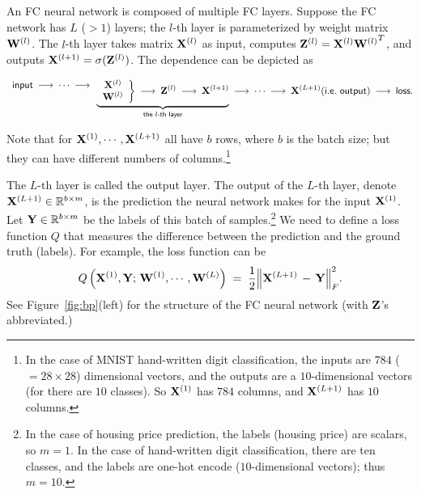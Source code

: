 \documentclass[11pt]{article}
\numberwithin{equation}{section}
\def\W{{\bf W}}
\def\X{{\bf X}}
\def\Y{{\bf Y}}
\def\Z{{\bf Z}}
\def\RB{{\mathbb R}}
\begin{document}
An FC neural network is composed of multiple FC layers.
Suppose the FC network has $L$ ($> 1$) layers; the $l$-th layer is parameterized by weight matrix $\W^{(l)}$.
The $l$-th layer takes matrix $\X^{(l)}$ as input,
computes $\Z^{(l)} = \X^{(l)} {\W^{(l)}}^T$,
and outputs $\X^{(l+1)} = \sigma (\Z^{(l)})$.
The dependence can be depicted as
\begin{small}
\begin{equation*}
    \begin{array}{c}
         \textsf{input} \: \longrightarrow \:  \cdots \: \longrightarrow   \\
         ~
    \end{array}
    \underbrace{
    \left.
    \begin{array}{c}
         \X^{(l)}   \\
         \W^{(l)} \\
    \end{array}
    \right\}
    \: \longrightarrow \: 
    \Z^{(l)}
    \: \longrightarrow \: 
    \X^{(l+1)} }_{\textsf{the } l\textsf{-th layer}} 
    \: \longrightarrow \: 
    \cdots
    \: \longrightarrow \: 
    \X^{(L+1)} (\textsf{i.e.\ output})
    \: \longrightarrow \: 
    \textsf{loss}.
\end{equation*}
\end{small}%
Note that for $\X^{(1)} , \cdots , \X^{(L+1)}$ all have $b$ rows, where $b$ is the batch size;
but they can have different numbers of columns.\footnote{In the case of MNIST hand-written digit classification, the inputs are $784$ ($=28\times 28$) dimensional vectors, and the outputs are a $10$-dimensional vectors (for there are $10$ classes).
So $\X^{(1)}$ has $784$ columns, and $\X^{(L+1)}$ has $10$ columns.}

The $L$-th layer is called the output layer.
The output of the $L$-th layer, denote $\X^{(L+1)} \in \RB^{b\times m}$, is the prediction the neural network makes for the input $\X^{(1)}$.
Let $\Y \in \RB^{b\times m}$ be the labels of this batch of samples.\footnote{In the case of housing price prediction, the labels (housing price) are scalars, so $m=1$. In the case of hand-written digit classification, there are ten classes, and the labels are one-hot encode ($10$-dimensional vectors); thus $m=10$.}
We need to define a loss function $Q$ that measures the difference between the prediction and the ground truth (labels).
For example, the loss function can be
\begin{equation*}
    Q \left( \X^{(1)} , \Y ; \, \W^{(1)}, \cdots , \W^{(L)} \right)
    \; = \; \frac{1}{2} \Big\| \X^{(L+1)} \, - \, \Y  \Big\|_F^2 .
\end{equation*}
See Figure~\ref{fig:bp}(left) for the structure of the FC neural network (with $\Z$'s abbreviated.)
\end{document}
